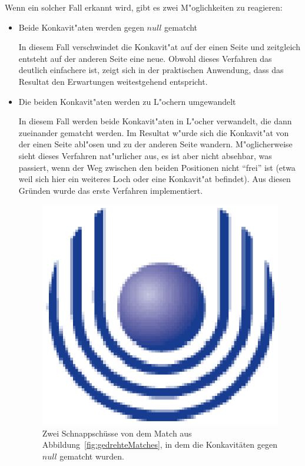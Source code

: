 Wenn ein solcher Fall erkannt wird, gibt es zwei M"oglichkeiten zu reagieren:
\begin{itemize}
\item Beide Konkavit"aten werden gegen $null$ gematcht

In diesem Fall verschwindet die Konkavit"at auf der einen Seite  und zeitgleich entsteht auf der anderen Seite eine neue. Obwohl dieses Verfahren das deutlich einfachere ist, zeigt sich in der praktischen Anwendung, dass das Resultat den Erwartungen weitestgehend entspricht.

\item Die beiden Konkavit"aten werden zu L"ochern umgewandelt

In diesem Fall werden beide Konkavit"aten in L"ocher verwandelt, die dann zueinander gematcht werden. Im Resultat w"urde sich die Konkavit"at von der einen Seite abl"osen und zu der anderen Seite wandern. M"oglicherweise sieht dieses Verfahren nat"urlicher aus, es ist aber nicht absehbar, was passiert, wenn der Weg zwischen den beiden Positionen nicht "`frei"' ist (etwa weil sich hier ein weiteres Loch oder eine Konkavit"at befindet). Aus diesen Gründen wurde das erste Verfahren implementiert.
\begin{figure}
	\centering
	\includegraphics{feu_logo2.eps}
	\caption[Schnappschüsse von den gedrehten Polygonen]{Zwei Schnappschüsse von dem Match aus Abbildung~\vref{fig:gedrehteMatches}, in dem die Konkavitäten gegen $null$ gematcht wurden.}
	\label{fig:gedrehteMatches2}
\end{figure}

\end{itemize}


